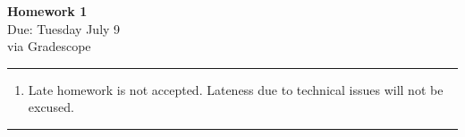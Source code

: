 \documentclass[12pt]{article}
\newif\ifshow
\begin{document}
\begin{center}
\ifshow
  \textbf{\Large Homework 1 Solution}\\
\else
  \textbf{\Large Homework 1}\\
\fi
Due: Tuesday July 9\\via Gradescope\\
\end{center}

\hrule

\vspace{0.2cm}

\begin{enumerate}[$\bullet$]  
\item Late homework is not accepted.  Lateness due to technical issues will not be excused.  
\end{enumerate}

\hrule

\vspace{0.5cm}
\end{document}

